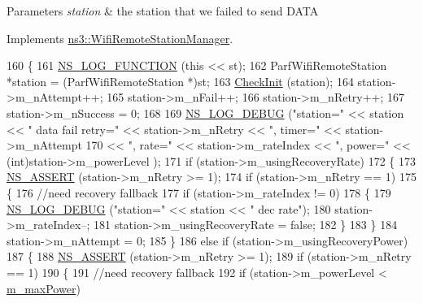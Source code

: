 \begin{DoxyParams}{Parameters}
{\em station} & the station that we failed to send D\+A\+TA \\
\hline
\end{DoxyParams}


Implements \hyperlink{classns3_1_1WifiRemoteStationManager_a38a4401b6232cb547f5a85337e02b12c}{ns3\+::\+Wifi\+Remote\+Station\+Manager}.


\begin{DoxyCode}
160 \{
161   \hyperlink{log-macros-disabled_8h_a90b90d5bad1f39cb1b64923ea94c0761}{NS\_LOG\_FUNCTION} (\textcolor{keyword}{this} << st);
162   ParfWifiRemoteStation *station = (ParfWifiRemoteStation *)st;
163   \hyperlink{classns3_1_1ParfWifiManager_a2a7ea7d1accf1ce9056c91929db2e7eb}{CheckInit} (station);
164   station->m\_nAttempt++;
165   station->m\_nFail++;
166   station->m\_nRetry++;
167   station->m\_nSuccess = 0;
168 
169   \hyperlink{group__logging_ga413f1886406d49f59a6a0a89b77b4d0a}{NS\_LOG\_DEBUG} (\textcolor{stringliteral}{"station="} << station << \textcolor{stringliteral}{" data fail retry="} << station->m\_nRetry << \textcolor{stringliteral}{", timer="}
       << station->m\_nAttempt
170                            << \textcolor{stringliteral}{", rate="} << station->m\_rateIndex << \textcolor{stringliteral}{", power="} << (\textcolor{keywordtype}{int})station->m\_powerLevel
      );
171   \textcolor{keywordflow}{if} (station->m\_usingRecoveryRate)
172     \{
173       \hyperlink{assert_8h_a6dccdb0de9b252f60088ce281c49d052}{NS\_ASSERT} (station->m\_nRetry >= 1);
174       \textcolor{keywordflow}{if} (station->m\_nRetry == 1)
175         \{
176           \textcolor{comment}{//need recovery fallback}
177           \textcolor{keywordflow}{if} (station->m\_rateIndex != 0)
178             \{
179               \hyperlink{group__logging_ga413f1886406d49f59a6a0a89b77b4d0a}{NS\_LOG\_DEBUG} (\textcolor{stringliteral}{"station="} << station << \textcolor{stringliteral}{" dec rate"});
180               station->m\_rateIndex--;
181               station->m\_usingRecoveryRate = \textcolor{keyword}{false};
182             \}
183         \}
184       station->m\_nAttempt = 0;
185     \}
186   \textcolor{keywordflow}{else} \textcolor{keywordflow}{if} (station->m\_usingRecoveryPower)
187     \{
188       \hyperlink{assert_8h_a6dccdb0de9b252f60088ce281c49d052}{NS\_ASSERT} (station->m\_nRetry >= 1);
189       \textcolor{keywordflow}{if} (station->m\_nRetry == 1)
190         \{
191           \textcolor{comment}{//need recovery fallback}
192           \textcolor{keywordflow}{if} (station->m\_powerLevel < \hyperlink{classns3_1_1ParfWifiManager_a6894ea0155e04eab0db55007342d5a78}{m\_maxPower})

\end{DoxyCode}
